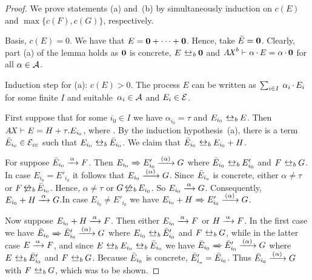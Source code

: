 \begin{proof}
  We prove statements (a) and~(b) by simultaneously induction on 
  $c(E)$ and $\max \lbrace c(F), c(G) \rbrace$, respectively.

  Basis, $c(E) = 0$. We have that $E= \normalfont{\textbf{0}}+\cdots+\normalfont{\textbf{0}}$. Hence,
  take $\bar{E}=\normalfont{\textbf{0}}$. Clearly, part (a) of the lemma holds as
  $\normalfont{\textbf{0}}$ is concrete, $E \brbisim \bfzero$ and $\mathit{A \mkern-2mu X}^b \vdash\alpha
  \mathop{.} E = \alpha \mathop{.} \normalfont{\textbf{0}}$ for all $\alpha \in \mathcal{A}$.

  Induction step for (a): $c(E) > 0$. The process $E$ can be written as 
  ${ \textstyle\sum_{i {\in} I} \: \alpha_i \mathop{.} E_i }$
  for some finite $I$ and suitable~$\alpha_i\in\mathcal{A}$ and $E_i\in\mathcal{E}$.

  First suppose that for some $i_0\in I$ we have $\alpha_{i_0} = \tau$
  and $E_{i_0} \brbisim E$.  Then $\mathit{A \mkern-2mu X} \vdash E = H + \tau.E_{i_0}$,
  where .
  \vspace{1pt} By the induction hypothesis~(a), there is a term
  $\bar{E}_{i_0} \in \mathcal{E}_{\mathit{cc}}$ such that $E_{i_0} \brbisim
  \Ebar_{i_0}$. We claim that $\Ebar_{i_0} \brbisim E_{i_0}+H$.

  For suppose $\Ebar_{i_0} \alphaarrow F$.
  \vspace*{1pt}
  Then $E_{i_0} \Arrow{} E'_{i_0} \alphahidearrow G$ where
  $\Ebar_{i_0}\brbisim E'_{i_0}$ 
  and $F \brbisim G$. In case $E_{i_0} = E'_{i_0}$ it follows that $E_{i_0}
  \alphahidearrow G$. 
  Since $\bar{E}_{i_o}$ is concrete, either $\alpha \neq \tau$ or $F
  \nbrbisim \Ebar_{i_0}$. 
  Hence, $\alpha \neq \tau$ or $G \nbrbisim E_{i_0}$. So $E_{i_0}
  \alphaarrow G$. 
  Consequently, $E_{i_0}+H \alphaarrow G$.\linebreak[3]
  In case $E_{i_0} \neq E'_{i_0}$ we have $E_{i_0}+H \Arrow{} E'_{i_0}
  \alphahidearrow G$. 

  Now suppose $E_{i_0} + H \alphaarrow F$.  Then either
  $E_{i_0} \alphaarrow F$ or $H \alphaarrow F$.  \vspace*{1pt} In the
  first case we have
  $\Ebar_{i_0} \Arrow{} \Ebar'_{i_0} \alphahidearrow G$ where
  $E_{i_0}\brbisim \Ebar'_{i_0}$ and $F \brbisim G$, \vspace{1pt}
  while in the latter case $E \alphaarrow F$, and since
  $E \brbisim E_{i_0} \brbisim \Ebar_{i_0}$ we have
  $\Ebar_{i_0} \Arrow{} \Ebar'_{i_0} \alphahidearrow G$ where
  $E\brbisim \Ebar'_{i_0}$ and $F \brbisim G$. Because $\bar{E}_{i_0}$
  is concrete, $\bar{E}'_{i_o} = \bar{E}_{i_0}$.  Thus
  $\Ebar_{i_0} \alphahidearrow G$ with $F \brbisim G$, which was
  to be shown.


\end{proof}
